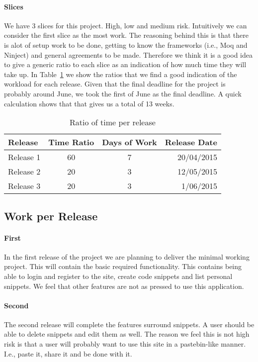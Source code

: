 \documentclass[10pt,a4paper,BCOR12mm, headexclude, footexclude,
  twoside, openright]{scrartcl}
\numberwithin{equation}{section} %
\numberwithin{figure}{section} %
\numberwithin{table}{section} %
\begin{document}
\paragraph{Slices}
We have 3 slices for this project. High, low and medium risk. Intuitively we can
consider the first slice as the most work. The reasoning behind this is that
there is alot of setup work to be done, getting to know the frameworks (i.e.,
Moq and Ninject) and general agreements to be made. Therefore we think it is a
good idea to give a generic ratio to each slice as an indication of how much
time they will take up. In Table~\ref{tbl:ratios} we show the ratios that we
find a good indication of the workload for each release. Given that the final
deadline for the project is probably around June, we took the first of June as
the final deadline. A quick calculation shows that that gives us a total of 13
weeks.
\begin{table}[h]
  \centering
  \label{tbl:ratios}
  \caption{Ratio of time per release}
  \begin{tabular}{| l| c| c| r | }
    \hline
    Release   & Time Ratio & Days of Work & Release Date \\
    \hline
    Release 1 & 60         & 7            & 20/04/2015 \\         
    Release 2 & 20         & 3            & 12/05/2015 \\
    Release 3 & 20         & 3            & 1/06/2015 \\
    \hline
  \end{tabular}
\end{table}

\subsection{Work per Release}
\paragraph{First} In the first release of the project we are planning to deliver the minimal
working project. This will contain the basic required functionality. This
contains being able to login and register to the site, create code snippets and
list personal snippets. We feel that other features are not as pressed to use this application.

\paragraph{Second} The second release will complete the features surround
snippets. A user should be able to delete snippets and edit them as well. The
reason we feel this is not high risk is that a user will probably want to use
this site in a pastebin-like manner. I.e., paste it, share it and be done with
it.
\end{document}
